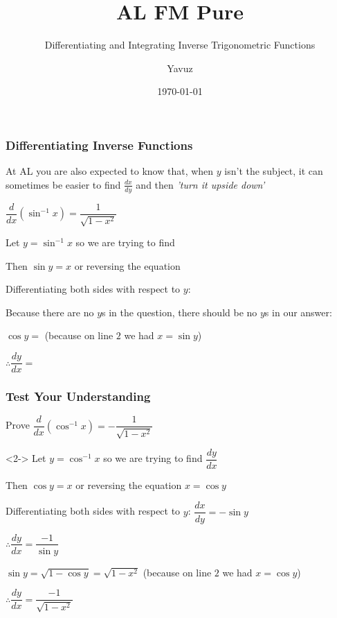 \documentclass{beamer}
\title[Pure]{{\color{aa}\Huge\adfbullet{9}}AL FM Pure}
\subtitle{Differentiating and Integrating Inverse Trigonometric Functions}
\author{Yavuz}
\date{\today}
\begin{document}
	
	\setlength{\abovedisplayskip}{0pt}
	\setlength{\belowdisplayskip}{0pt}
	\setlength{\abovedisplayshortskip}{0pt}
	\setlength{\belowdisplayshortskip}{0pt}
	
	\frame{\titlepage}
	
	
	\begin{frame}[shrink=15]
		\frametitle{Differentiating Inverse Functions }
		\alert<1>{At AL you are also expected to know that, when $y$ isn't the subject, it can sometimes be easier to find $\frac{dx}{dy}$ and then \emph{'turn it upside down'}}
		
		\begin{definition}
			$\dfrac{d}{dx}\left( \sin ^{-1}x\right) =\dfrac{1}{\sqrt{1-x^{2}}}$
		\end{definition}
		
		Let $y = \sin ^{-1}x$ so we are trying to find 
		
		Then $\sin y = x$ or reversing the equation 
		
		Differentiating both sides with respect to $y$: 
		
		Because there are no $y$s in the question, there should be no $y$s in our answer: 
		
		$\cos y=$ (because on line $2$ we had $x = \sin y$)
		
		$\therefore\dfrac{dy}{dx}=$
	\end{frame}
	
	
	\begin{frame}[shrink=15]
		\frametitle{Test Your Understanding}
		\begin{problem}
			Prove $\dfrac{d}{dx}\left( \cos ^{-1}x\right) =-\dfrac{1}{\sqrt{1-x^{2}}}$
		\end{problem}
		
		\begin{solution}<2->
			Let $y = \cos^{-1}x$ so we are trying to find $\dfrac{dy}{dx}$ 
			
			Then $\cos y = x$ or reversing the equation $x = \cos y$
			
			Differentiating both sides with respect to $y$: $\dfrac{dx}{dy} = -\sin y$
			
			$\therefore \dfrac{dy}{dx}=\dfrac{-1}{\sin y}$
			
			$\sin y=\sqrt{1-\cos y}=\sqrt{1-x^{2}}$ (because on line $2$ we had $x = \cos y$)
			
			$\therefore \dfrac{dy}{dx}=\dfrac{-1}{\sqrt{1-x^{2}}}$
			
		\end{solution}
	\end{frame}
	
\end{document}
